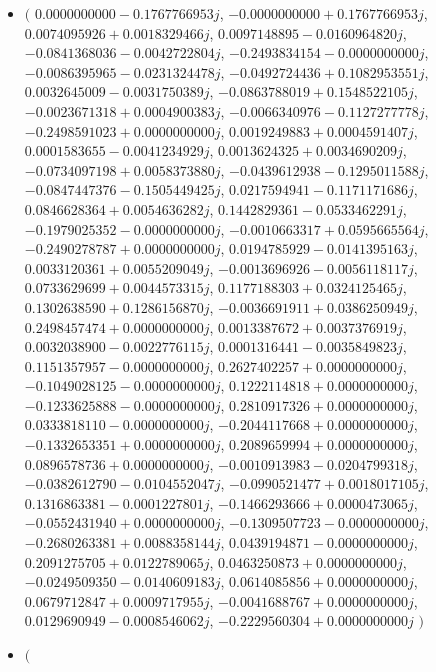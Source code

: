 \documentclass[14pt,a4paper]{article}
\begin{document}
\begin{itemize}
\item
$\big($
$0.0000000000-0.1767766953j$, $-0.0000000000+0.1767766953j$, $0.0074095926+0.0018329466j$, $0.0097148895-0.0160964820j$, $-0.0841368036-0.0042722804j$, $-0.2493834154-0.0000000000j$, $-0.0086395965-0.0231324478j$, $-0.0492724436+0.1082953551j$, $0.0032645009-0.0031750389j$, $-0.0863788019+0.1548522105j$, $-0.0023671318+0.0004900383j$, $-0.0066340976-0.1127277778j$, $-0.2498591023+0.0000000000j$, $0.0019249883+0.0004591407j$, $0.0001583655-0.0041234929j$, $0.0013624325+0.0034690209j$, $-0.0734097198+0.0058373880j$, $-0.0439612938-0.1295011588j$, $-0.0847447376-0.1505449425j$, $0.0217594941-0.1171171686j$, $0.0846628364+0.0054636282j$, $0.1442829361-0.0533462291j$, $-0.1979025352-0.0000000000j$, $-0.0010663317+0.0595665564j$, $-0.2490278787+0.0000000000j$, $0.0194785929-0.0141395163j$, $0.0033120361+0.0055209049j$, $-0.0013696926-0.0056118117j$, $0.0733629699+0.0044573315j$, $0.1177188303+0.0324125465j$, $0.1302638590+0.1286156870j$, $-0.0036691911+0.0386250949j$, $0.2498457474+0.0000000000j$, $0.0013387672+0.0037376919j$, $0.0032038900-0.0022776115j$, $0.0001316441-0.0035849823j$, $0.1151357957-0.0000000000j$, $0.2627402257+0.0000000000j$, $-0.1049028125-0.0000000000j$, $0.1222114818+0.0000000000j$, $-0.1233625888-0.0000000000j$, $0.2810917326+0.0000000000j$, $0.0333818110-0.0000000000j$, $-0.2044117668+0.0000000000j$, $-0.1332653351+0.0000000000j$, $0.2089659994+0.0000000000j$, $0.0896578736+0.0000000000j$, $-0.0010913983-0.0204799318j$, $-0.0382612790-0.0104552047j$, $-0.0990521477+0.0018017105j$, $0.1316863381-0.0001227801j$, $-0.1466293666+0.0000473065j$, $-0.0552431940+0.0000000000j$, $-0.1309507723-0.0000000000j$, $-0.2680263381+0.0088358144j$, $0.0439194871-0.0000000000j$, $0.2091275705+0.0122789065j$, $0.0463250873+0.0000000000j$, $-0.0249509350-0.0140609183j$, $0.0614085856+0.0000000000j$, $0.0679712847+0.0009717955j$, $-0.0041688767+0.0000000000j$, $0.0129690949-0.0008546062j$, $-0.2229560304+0.0000000000j$
$\big)$
\item
$\big($

\end{itemize}
\end{document}
